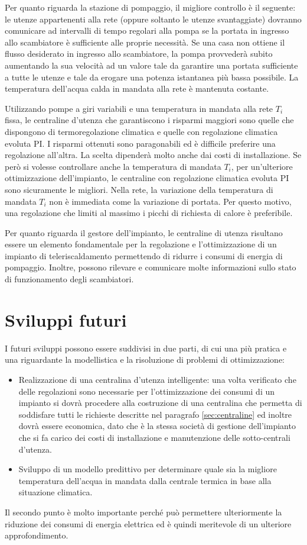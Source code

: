 \documentclass[laurea,oneside,11pt]{USiena_tesiLM3}
\begin{document}
Per quanto riguarda la stazione di pompaggio, il migliore controllo è il seguente: le utenze appartenenti alla rete (oppure soltanto le utenze svantaggiate)  dovranno comunicare ad intervalli di tempo regolari alla pompa se la portata in ingresso allo scambiatore è sufficiente alle proprie necessità. Se una casa non ottiene il flusso desiderato in ingresso allo scambiatore, la pompa provvederà subito aumentando la sua velocità ad un valore tale da garantire una portata sufficiente a tutte le utenze e tale da erogare una potenza istantanea più bassa possibile. La temperatura dell'acqua calda in mandata alla rete è mantenuta costante.

Utilizzando pompe a giri variabili e una temperatura in mandata alla rete $T_i$ fissa, le centraline d'utenza che garantiscono i risparmi maggiori sono quelle che dispongono di termoregolazione climatica e quelle con regolazione climatica evoluta PI. I risparmi ottenuti sono paragonabili ed è difficile preferire una regolazione all'altra. La scelta dipenderà molto anche dai costi di installazione. Se però si volesse controllare anche la temperatura di mandata $T_i$, per un'ulteriore ottimizzazione dell'impianto, le centraline con regolazione climatica evoluta PI sono sicuramente le migliori. Nella rete, la variazione della temperatura di mandata $T_i$ non è immediata come la variazione di portata. Per questo motivo, una regolazione che limiti al massimo i picchi di richiesta di calore è preferibile.

Per quanto riguarda il gestore dell'impianto, le centraline di utenza risultano essere un elemento fondamentale per la regolazione e l'ottimizzazione di un impianto di teleriscaldamento permettendo di ridurre i consumi di energia di pompaggio.  Inoltre, possono rilevare e comunicare   molte informazioni sullo stato di funzionamento degli scambiatori.


\section{Sviluppi futuri}
I futuri sviluppi possono essere suddivisi in due parti, di cui una più pratica e una riguardante la modellistica e la risoluzione di problemi di ottimizzazione: 
\begin{itemize}
\item  Realizzazione di una centralina d'utenza intelligente: una volta verificato che delle regolazioni sono necessarie per l'ottimizzazione dei consumi di un impianto si dovrà procedere alla costruzione di una centralina che permetta di soddisfare tutti le richieste descritte nel paragrafo \ref{sec:centraline} ed inoltre dovrà essere economica, dato che è la stessa società  di gestione dell'impianto che si fa carico dei costi di installazione e manutenzione delle sotto-centrali d'utenza.
\item Sviluppo di un modello predittivo per determinare quale sia la migliore temperatura dell'acqua in mandata dalla centrale termica in base alla situazione climatica.
\end{itemize}
Il secondo punto è molto importante perché può permettere ulteriormente la riduzione dei consumi di energia elettrica ed è quindi meritevole di un ulteriore approfondimento. 
 
\end{document}
